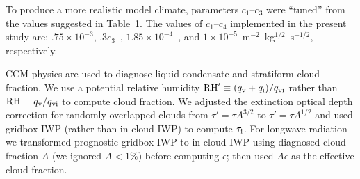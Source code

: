 To produce a more realistic model climate, parameters $c_1$--$c_3$ 
were ``tuned'' from the values suggested in \cite{ZeK961} Table~1.
The values of $c_1$--$c_4$ implemented in the present study are: $.75
\times 10^{-3}$, $.3c_3$~\xs, $1.85 \times 10^{-4}$~\xs, and 
$1 \times 10^{-5}$~m$^{-2}$~kg$^{1/2}$~s$^{-1/2}$, respectively. 

CCM physics \cite[]{HBB93} are used to diagnose liquid condensate and
stratiform cloud fraction. 
We use a potential relative humidity $\mbox{${\mbox{\textrm{RH}}}'$} \equiv (\mbox{$q_\mathrm{v}$} + \mbox{$q_\mathrm{i}$})/\mbox{$q_\mathrm{vi}$}$
rather than $\mbox{\textrm{RH}} \equiv \mbox{$q_\mathrm{v}$}/\mbox{$q_\mathrm{vi}$}$ to compute cloud fraction.
We adjusted the extinction optical depth correction for randomly
overlapped clouds from $\tau' = \tau A^{3/2}$ to $\tau' = \tau
A^{1/2}$ and used gridbox IWP (rather than in-cloud IWP) to compute
$\mbox{$\tau_\mathrm{i}$}$. 
For longwave radiation we transformed prognostic gridbox IWP to
in-cloud IWP using diagnosed cloud fraction $A$ (we ignored $A < 1\%$)
before computing $\epsilon$; then used $A\epsilon$ as the effective
cloud fraction. 


